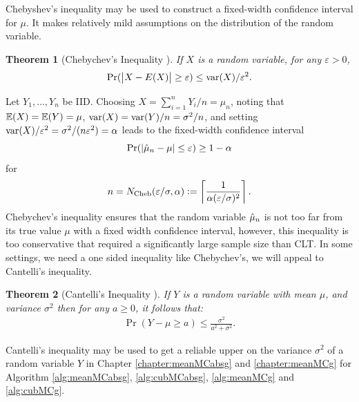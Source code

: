 \documentclass{iitthesis}
\newtheorem{theorem}{Theorem}[section]
\theoremstyle{definition}
\begin{document}

Chebyshev's inequality may be used to construct a fixed-width confidence interval for $\mu$.  It makes relatively mild assumptions on the distribution of the random variable.

\begin{theorem}[Chebychev's Inequality {\cite[6.1.c]{LB10}}] \label{ChebyThm}
If $X$ is a random variable, for any $\varepsilon>0$, 
$$\Pr(\left \lvert X-E(X) \right \rvert \ge \varepsilon) \le  \operatorname{var}(X)/\varepsilon^2.$$
\end{theorem}
Let $Y_1, \ldots, Y_n$ be IID. Choosing $X=\sum_{i=1}^n Y_i/n = \mu_n$, noting that $\mathbb{E}(X) = \mathbb{E}(Y) = \mu$, $\operatorname{var}(X) = \operatorname{var}(Y)/n = \sigma^2/n$, and setting $\operatorname{var}(X)/\varepsilon^2=\sigma^2/(n\varepsilon^2) = \alpha$ leads to the fixed-width confidence interval 
\[
\Pr(\left \lvert \hat{\mu}_{n}-\mu \right \rvert \le \varepsilon) \ge 1- \alpha 
\]
 for 
 \begin{align}
n=N_{\text{Cheb}}(\varepsilon/\sigma,\alpha):= \left \lceil \frac{1}{\alpha (\varepsilon/\sigma)^2} \right \rceil.
 \end{align}
 Chebychev's inequality ensures that the random variable $\hat{\mu}_n$ is not too far from its true value $\mu$ with a fixed width confidence interval, however, this inequality is too conservative that required a significantly large sample size than CLT. In some settings, we need a one sided inequality like Chebychev's, we will appeal to Cantelli's inequality.
 

\begin{theorem}[Cantelli's Inequality {\cite[6.1.e]{LB10}}]\label{CanThm} If $Y$ is a random variable with mean $\mu$, and variance $\sigma^2$ then for any $a \geq 0$, it follows that: 
\begin{align}
\Pr(Y-\mu \ge a) \le  \frac{\sigma^2}{a^2+\sigma^2}.
\end{align}
\end{theorem}
Cantelli's inequality may be used to get a reliable upper on the variance $\sigma^2$ of a random variable $Y$ in Chapter \ref{chapter:meanMCabsg} and \ref{chapter:meanMCg} for Algorithm \ref{alg:meanMCabsg}, \ref{alg:cubMCabsg}, \ref{alg:meanMCg} and \ref{alg:cubMCg}.

\end{document}

